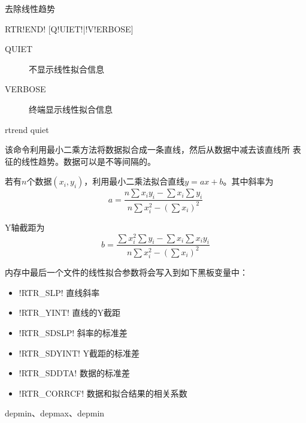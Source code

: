 \label{cmd:rtrend}

去除线性趋势

\begin{SACSTX}
RTR!END! [Q!UIET!|!V!ERBOSE]
\end{SACSTX}

\begin{description}
\item [QUIET] 不显示线性拟合信息
\item [VERBOSE] 终端显示线性拟合信息
\end{description}

\begin{SACDFT}
rtrend quiet
\end{SACDFT}

该命令利用最小二乘方法将数据拟合成一条直线，然后从数据中减去该直线所
表征的线性趋势。数据可以是不等间隔的。

若有$n$个数据$(x_i,y_i)$，利用最小二乘法拟合直线$y=ax+b$。其中斜率为
\[
    a = \frac{n\sum x_i y_i - \sum x_i \sum y_i}
    {n\sum x_i^2 - (\sum x_i)^2}
\]

Y轴截距为
\[
    b = \frac{\sum x_i^2 \sum y_i - \sum x_i \sum x_i y_i}
    {n\sum x_i^2 - (\sum x_i)^2}
\]

内存中最后一个文件的线性拟合参数将会写入到如下黑板变量中：
\begin{itemize}
\item !RTR_SLP! 直线斜率
\item !RTR_YINT! 直线的Y截距
\item !RTR_SDSLP! 斜率的标准差
\item !RTR_SDYINT! Y截距的标准差
\item !RTR_SDDTA! 数据的标准差
\item !RTR_CORRCF! 数据和拟合结果的相关系数
\end{itemize}

depmin、depmax、depmin

